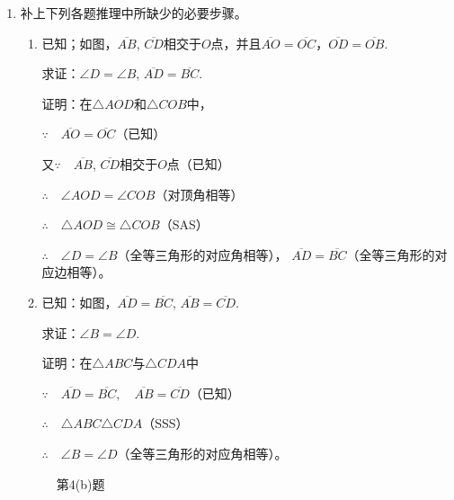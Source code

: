 \begin{enumerate}
\item 补上下列各题推理中所缺少的必要步骤。
\begin{enumerate}
	\item 已知；如图，$\overline{AB}$, $\overline{CD}$相交于$O$点，并且$\overline{AO}=\overline{OC}$，$\overline{OD}=\overline{OB}$.

求证：$\angle D=\angle B$, $\overline{AD}=\overline{BC}$.

证明：在$\triangle AOD$和$\triangle COB$中，

$\because\quad \overline{AO}=\overline{OC}$（已知）

又$\because\quad \overline{AB}$, $\overline{CD}$相交于$O$点（已知）

$\therefore\quad \angle AOD=\angle COB$（对顶角相等）

$\therefore\quad \triangle AOD\cong \triangle COB$（SAS）

$\therefore\quad \angle D=\angle B$（全等三角形的对应角相等），
$\overline{AD}=\overline{BC}$（全等三角形的对应边相等）。

\item 已知：如图，$\overline{AD}=\overline{BC}$, $\overline{AB}=\overline{CD}$.

求证：$\angle B=\angle D$.

证明：在$\triangle ABC$与$\triangle CDA$中

$\because\quad \overline{AD}=\overline{BC},\quad \overline{AB}=\overline{CD}$（已知）

$\therefore\quad \triangle ABC\triangle CDA$（SSS）

$\therefore\quad \angle B=\angle D$（全等三角形的对应角相等）。


\end{enumerate}

\begin{figure}[htp]\centering
    \begin{minipage}[t]{0.48\textwidth}
    \centering
{}
    \caption*{第4(b)题}
    \end{minipage}
    \begin{minipage}[t]{0.48\textwidth}
    \centering
\end{minipage}
\end{figure}
\end{enumerate}
